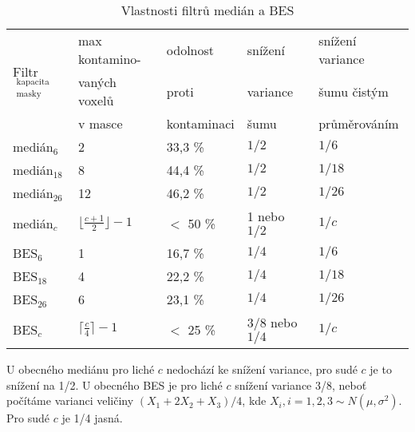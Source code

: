 \begin{table}[h]\label{tab med BES}
    \begin{center}
    \begin{tabular}{lllll}
      \toprule
      \multirow{3}{*}{Filtr$_{\mathrm{\substack{kapacita\\ masky}}}$} & max kontamino- & odolnost    & snížení    & snížení variance \\
                                                    & vaných voxelů   & proti       & variance   & šumu čistým      \\
                                                    & v masce         & kontaminaci & šumu       & průměrováním     \\
      \midrule
      medián$_{\mathrm{6}}$             & 2                 & 33,3 \%       & $1/2$    & $1/6$ \\
      medián$_{\mathrm{18}}$            & 8                 & 44,4 \%       & $1/2$    & $1/18$ \\
      medián$_{\mathrm{26}}$            & 12                & 46,2 \%       & $1/2$    & $1/26$  \\
      medián$_{c}$                      & $\lfloor\frac{c+1}{2}\rfloor-1$& $<$ 50 \%& 1 nebo $1/2$& $1/c$\\
      BES$_{\mathrm{6}}$                & 1                 & 16,7 \%       & $1/4$   & $1/6$ \\
      BES$_{\mathrm{18}}$               & 4                 & 22,2 \%       & $1/4$   & $1/18$ \\
      BES$_{\mathrm{26}}$               & 6                 & 23,1 \%       & $1/4$   & $1/26$ \\
      BES$_{c}$                         & $\lceil\frac{c}{4}\rceil-1$& $<$ 25 \%& $3/8$ nebo $1/4$& $1/c$\\
      \bottomrule
    \end{tabular}
    \caption{Vlastnosti filtrů medián a BES}
    \end{center}
\end{table}

    U obecného mediánu pro liché $c$ nedochází ke snížení variance, pro sudé $c$ je to snížení na 1/2. U obecného BES je pro liché $c$ snížení variance 3/8, neboť počítáme varianci veličiny $(X_1 + 2X_2 + X_3)/4$, kde $X_i, i = 1,2,3 \sim N(\mu,\sigma^2)$. Pro sudé $c$ je 1/4 jasná.

